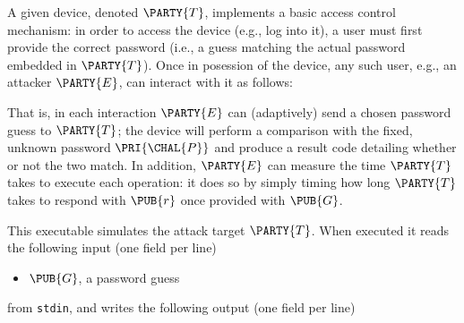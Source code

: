 %



A given device, denoted $\PARTY{T}$, 
implements a basic access control mechanism: in order to access the device
(e.g., log into it), a user must first provide the correct password (i.e., 
a guess matching the actual password embedded in $\PARTY{T}$).  
Once in posession of the device, any such user, e.g., 
an attacker $\PARTY{E}$, can interact with it as follows:

\begin{center}

\end{center}

\noindent
That is, in each interaction $\PARTY{E}$ can (adaptively) send 
a chosen password guess
to $\PARTY{T}$; the device will
perform a comparison with the fixed, unknown password $\PRI{\CHAL{P}}$ 
and produce 
a result code detailing whether or not the two match.
In addition, $\PARTY{E}$ can measure the time $\PARTY{T}$ takes to execute 
each operation: it does so
by simply timing how long $\PARTY{T}$ takes to respond with $\PUB{r}$ once
provided with $\PUB{G}$.




This executable simulates the attack target $\PARTY{T}$.  When executed it 
 reads the following  input (one field per line)

\begin{itemize}
\item $\PUB{G}$,
      a  password guess
\end{itemize}

\noindent
from \lstinline[language={bash}]{stdin},
and 
writes the following output (one field per line)

